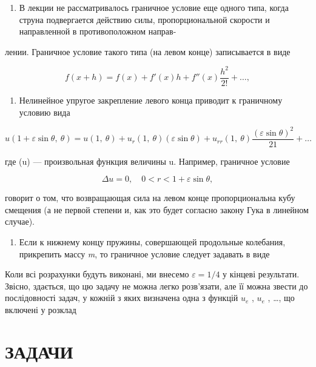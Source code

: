 \documentclass[
  ukrainian,
]{article}
\providecommand{\tightlist}{%
  \setlength{\itemsep}{0pt}\setlength{\parskip}{0pt}}
\begin{document}
\begin{enumerate}
\def\labelenumi{\arabic{enumi}.}
\tightlist
\item
  В лекции не рассматривалось граничное условие еще одного типа, когда
  струна подвергается действию силы, пропорциональной скорости и
  направленной в противоположном направ-
\end{enumerate}

лении. Граничное условие такого типа (на левом конце) записывается в
виде

\[
f(x+h) = f(x) + f'(x)h + f''(x)\frac{h^2}{2!} + \dots,
\]

\begin{enumerate}
\def\labelenumi{\arabic{enumi}.}
\setcounter{enumi}{1}
\tightlist
\item
  Нелинейное упругое закрепление левого конца приводит к граничному
  условию вида
\end{enumerate}

\[
u(1+\varepsilon\sin\theta,\ \theta)=u(1,\ \theta)+u_r(1,\ \theta)(\varepsilon\sin\theta)+u_{rr}(1,\ \theta)\frac{(\varepsilon\sin\theta)^2}{21}+\ldots
\]

где \varphi(u) --- произвольная функция величины u. Например, граничное
условие

\[
\Delta u = 0, \quad 0 < r < 1 + \varepsilon \sin \theta,
\]

говорит о том, что возвращающая сила на левом конце пропорциональна кубу
смещения (а не первой степени и, как это будет согласно закону Гука в
линейном случае).

\begin{enumerate}
\def\labelenumi{\arabic{enumi}.}
\setcounter{enumi}{2}
\tightlist
\item
  Если к нижнему концу пружины, совершающей продольные колебания,
  прикрепить массу \emph{m}, то граничное условие следует задавать в
  виде
\end{enumerate}

Коли всі розрахунки будуть виконані, ми внесемо \(\varepsilon=1/4\) у
кінцеві результати. Звісно, здається, що цю задачу не можна легко
розв'язати, але її можна звести до послідовності задач, у кожній з яких
визначена одна з функцій \(u_{\mathrm{ }e}\) , \(u_{\mathrm{ }e}\) ,
\ldots, що включені у розклад

\section{ЗАДАЧИ}\label{ux437ux430ux434ux430ux447ux438-5}
\end{document}
